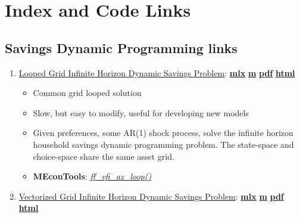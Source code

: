 \documentclass[
]{book}
\providecommand{\tightlist}{%
  \setlength{\itemsep}{0pt}\setlength{\parskip}{0pt}}
\begin{document}
\hypertarget{appendix-appendix}{%
\appendix}


\hypertarget{index-and-code-links}{%
\chapter{Index and Code Links}\label{index-and-code-links}}

\hypertarget{savings-dynamic-programming-links}{%
\section{Savings Dynamic Programming links}\label{savings-dynamic-programming-links}}

\begin{enumerate}
\def\labelenumi{\arabic{enumi}.}
\tightlist
\item
  \href{https://fanwangecon.github.io/MEconTools/MEconTools/doc/vfi/htmlpdfm/fx_vfi_az_loop.html}{Looped Grid Infinite Horizon Dynamic Savings Problem}: \href{https://github.com/FanWangEcon/MEconTools/blob/master/MEconTools/doc/vfi/fx_vfi_az_loop.mlx}{\textbf{mlx}} \textbar{} \href{https://github.com/FanWangEcon/MEconTools/blob/master/MEconTools/doc/vfi/htmlpdfm/fx_vfi_az_loop.m}{\textbf{m}} \textbar{} \href{https://github.com/FanWangEcon/MEconTools/blob/master/MEconTools/doc/vfi/htmlpdfm/fx_vfi_az_loop.pdf}{\textbf{pdf}} \textbar{} \href{https://fanwangecon.github.io/MEconTools/MEconTools/doc/vfi/htmlpdfm/fx_vfi_az_loop.html}{\textbf{html}}

  \begin{itemize}
  \tightlist
  \item
    Common grid looped solution
  \item
    Slow, but easy to modify, useful for developing new models
  \item
    Given preferences, some AR(1) shock process, solve the infinite horizon household savings dynamic programming problem. The state-space and choice-space share the same asset grid.
  \item
    \textbf{MEconTools}: \emph{\href{https://github.com/FanWangEcon/MEconTools/blob/master/MEconTools/vfi/ff_vfi_az_loop.m}{ff\_vfi\_az\_loop()}}
  \end{itemize}
\item
  \href{https://fanwangecon.github.io/MEconTools/MEconTools/doc/vfi/htmlpdfm/fx_vfi_az_vec.html}{Vectorized Grid Infinite Horizon Dynamic Savings Problem}: \href{https://github.com/FanWangEcon/MEconTools/blob/master/MEconTools/doc/vfi/fx_vfi_az_vec.mlx}{\textbf{mlx}} \textbar{} \href{https://github.com/FanWangEcon/MEconTools/blob/master/MEconTools/doc/vfi/htmlpdfm/fx_vfi_az_vec.m}{\textbf{m}} \textbar{} \href{https://github.com/FanWangEcon/MEconTools/blob/master/MEconTools/doc/vfi/htmlpdfm/fx_vfi_az_vec.pdf}{\textbf{pdf}} \textbar{} \href{https://fanwangecon.github.io/MEconTools/MEconTools/doc/vfi/htmlpdfm/fx_vfi_az_vec.html}{\textbf{html}}


\end{enumerate}
\end{document}
